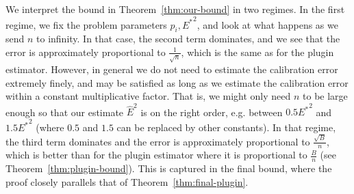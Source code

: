 We interpret the bound in Theorem~\ref{thm:our-bound} in two regimes. In the first regime, we fix the problem parameters $p_i, {E^*}^2$, and look at what happens as we send $n$ to infinity. In that case, the second term dominates, and we see that the error is approximately proportional to $\frac{1}{\sqrt{n}}$, which is the same as for the plugin estimator. However, in general we do not need to estimate the calibration error extremely finely, and may be satisfied as long as we estimate the calibration error within a constant multiplicative factor. That is, we might only need $n$ to be large enough so that our estimate $\hat{E}^2$ is on the right order, e.g. between $0.5 {E^*}^2$ and $1.5 {E^*}^2$ (where $0.5$ and $1.5$ can be replaced by other constants). In that regime, the third term dominates and the error is approximately proportional to $\frac{\sqrt{B}}{n}$, which is better than for the plugin estimator where it is proportional to $\frac{B}{n}$ (see Theorem~\ref{thm:plugin-bound}). This is captured in the final bound, where the proof closely parallels that of Theorem~\ref{thm:final-plugin}.

\begin{finalCanceling}
\finalCancelingText{}
\end{finalCanceling}
